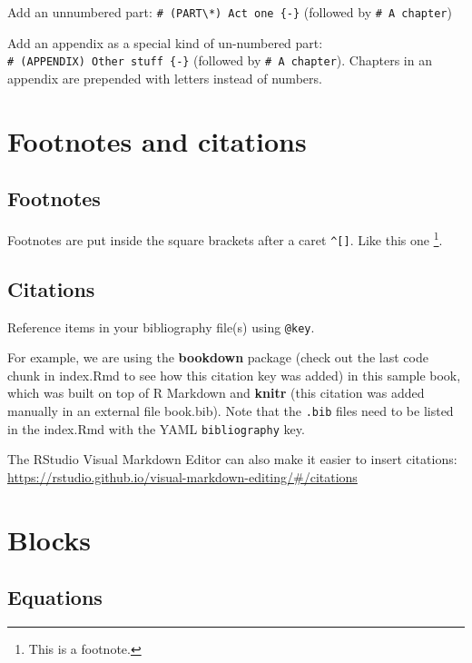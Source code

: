 \documentclass[
]{book}
\theoremstyle{definition}
\theoremstyle{definition}
\theoremstyle{definition}
\theoremstyle{definition}
\theoremstyle{remark}
\begin{document}
Add an unnumbered part: \texttt{\#\ (PART\textbackslash{}*)\ Act\ one\ \{-\}} (followed by \texttt{\#\ A\ chapter})

Add an appendix as a special kind of un-numbered part: \texttt{\#\ (APPENDIX)\ Other\ stuff\ \{-\}} (followed by \texttt{\#\ A\ chapter}). Chapters in an appendix are prepended with letters instead of numbers.

\hypertarget{footnotes-and-citations}{%
\chapter{Footnotes and citations}\label{footnotes-and-citations}}

\hypertarget{footnotes}{%
\section{Footnotes}\label{footnotes}}

Footnotes are put inside the square brackets after a caret \texttt{\^{}{[}{]}}. Like this one \footnote{This is a footnote.}.

\hypertarget{citations}{%
\section{Citations}\label{citations}}

Reference items in your bibliography file(s) using \texttt{@key}.

For example, we are using the \textbf{bookdown} package \citep{R-bookdown} (check out the last code chunk in index.Rmd to see how this citation key was added) in this sample book, which was built on top of R Markdown and \textbf{knitr} \citep{xie2015} (this citation was added manually in an external file book.bib).
Note that the \texttt{.bib} files need to be listed in the index.Rmd with the YAML \texttt{bibliography} key.

The RStudio Visual Markdown Editor can also make it easier to insert citations: \url{https://rstudio.github.io/visual-markdown-editing/\#/citations}

\hypertarget{blocks}{%
\chapter{Blocks}\label{blocks}}

\hypertarget{equations}{%
\section{Equations}\label{equations}}
\end{document}
